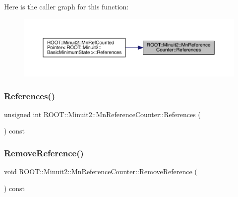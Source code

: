 Here is the caller graph for this function\+:\nopagebreak
\begin{figure}[H]
\begin{center}
\leavevmode
\includegraphics[width=350pt]{dc/da2/classROOT_1_1Minuit2_1_1MnReferenceCounter_a8c4e8a4427e3f5eeaad4001a364f8a5a_icgraph}
\end{center}
\end{figure}
\mbox{\label{classROOT_1_1Minuit2_1_1MnReferenceCounter_a8c4e8a4427e3f5eeaad4001a364f8a5a}} 
\subsubsection{\texorpdfstring{References()}{References()}\hspace{0.1cm}{\footnotesize\ttfamily [2/2]}}
{\footnotesize\ttfamily unsigned int R\+O\+O\+T\+::\+Minuit2\+::\+Mn\+Reference\+Counter\+::\+References (\begin{DoxyParamCaption}{ }\end{DoxyParamCaption}) const\hspace{0.3cm}{\ttfamily [inline]}}

\mbox{\label{classROOT_1_1Minuit2_1_1MnReferenceCounter_a243db2ef8fc1fab0a29ea1c83aececab}} 
\subsubsection{\texorpdfstring{RemoveReference()}{RemoveReference()}\hspace{0.1cm}{\footnotesize\ttfamily [1/2]}}
{\footnotesize\ttfamily void R\+O\+O\+T\+::\+Minuit2\+::\+Mn\+Reference\+Counter\+::\+Remove\+Reference (\begin{DoxyParamCaption}{ }\end{DoxyParamCaption}) const\hspace{0.3cm}{\ttfamily [inline]}}

